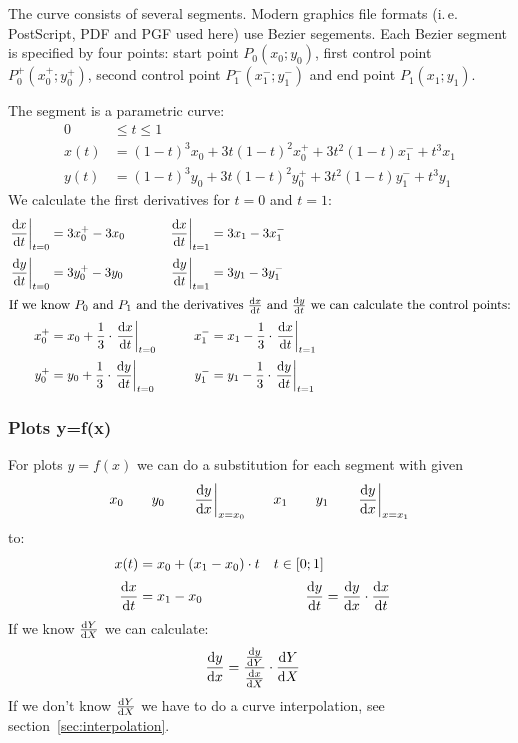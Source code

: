 \documentclass[origlongtable]{scrartcl}
\begin{document}
The curve consists of several segments. Modern graphics file formats
(i.\,e. PostScript, PDF and PGF used here) use Bezier segements. Each Bezier
segment is specified by four points:
start point \(P_0(x_0;y_0)\), first control point \(P_0^+(x_0^+;y_0^+)\),
second control point \(P_1^-(x_1^-;y_1^-)\) and end point \(P_1(x_1;y_1)\).

The segment is a parametric curve:
\begin{align*}
0&\leq{}t\leq 1\\[0.2em]
x(t)&={(1-t)}^3x_0+3t{(1-t)}^2x_0^++3t^2(1-t)x_1^-+t^3x_1\\[0.2em]
y(t)&={(1-t)}^3y_0+3t{(1-t)}^2y_0^++3t^2(1-t)y_1^-+t^3y_1
\end{align*}
We calculate the first derivatives for \(t=0\) and \(t=1\):
\begin{align*}
{\left.\frac{\mathrm{d}x}{\mathrm{d}t}\right|}_{t=0}&=3x_0^+-3x_0&{\left.\frac{\mathrm{d} x}{\mathrm{d} t}\right|}_{t=1}&=3x_1-3x_1^-\\[0.2em]
{\left.\frac{\mathrm{d}y}{\mathrm{d}t}\right|}_{t=0}&=3y_0^+-3y_0&{\left.\frac{\mathrm{d} y}{\mathrm{d} t}\right|}_{t=1}&=3y_1-3y_1^-\\
\intertext{If we know \(P_0\) and \(P_1\) and the derivatives \(\tfrac{\mathrm{d}x}{\mathrm{d}t}\) and \(\tfrac{\mathrm{d}y}{\mathrm{d}t}\) we can calculate the control points:}
x_0^+&=x_0+\frac{1}{3}\cdot{\left.\frac{\mathrm{d}x}{\mathrm{d}t}\right|}_{t=0}&x_1^-&=x_1-\frac{1}{3}\cdot{\left.\frac{\mathrm{d}x}{\mathrm{d}t}\right|}_{t=1}\\[0.2em]
y_0^+&=y_0+\frac{1}{3}\cdot{\left.\frac{\mathrm{d}y}{\mathrm{d}t}\right|}_{t=0}&y_1^-&=y_1-\frac{1}{3}\cdot{\left.\frac{\mathrm{d}y}{\mathrm{d}t}\right|}_{t=1}
\end{align*}
\clearpage
\subsubsection{Plots y=f(x)}
For plots \(y=f(x)\) we can do a substitution for each segment with given
\[
x_0\qquad{}y_0\qquad{\left.\frac{\mathrm{d}y}{\mathrm{d}x}\right|}_{x=x_0}\qquad{}x_1\qquad{}y_1\qquad{\left.\frac{\mathrm{d}y}{\mathrm{d}x}\right|}_{x=x_1}
\]
to:
\begin{align*}
x(t)&=x_0+(x_1-x_0)\cdot t&t\in[0;1]\\[0.2em]
\frac{\mathrm{d} x}{\mathrm{d} t}&=x_1-x_0&\frac{\mathrm{d} y}{\mathrm{d} t}&=\frac{\mathrm{d} y}{\mathrm{d} x}\cdot\frac{\mathrm{d} x}{\mathrm{d} t}
\end{align*}
If we know \(\tfrac{\mathrm{d} Y}{\mathrm{d} X}\) we can calculate:
\begin{align*}
\frac{\mathrm{d} y}{\mathrm{d} x}&=\frac{\frac{\mathrm{d} y}{\mathrm{d} Y}}{\frac{\mathrm{d} x}{\mathrm{d} X}}\cdot\frac{\mathrm{d} Y}{\mathrm{d} X}
\end{align*}
If we don't know \(\tfrac{\mathrm{d} Y}{\mathrm{d} X}\) we have to do a curve
interpolation, see section~\vref{sec:interpolation}.
\clearpage
\end{document}
